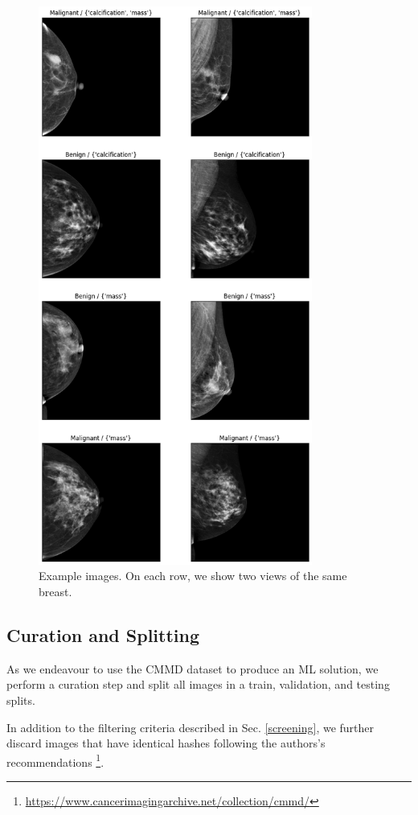 \documentclass[11pt]{article}
\begin{document}
\begin{figure}[htbp]
\centering
\includegraphics[width=9cm]{./images/previews.png}
\caption{\label{fig:preview}Example images. On each row, we show two views of the same breast.}
\end{figure}

\subsection{\label{split}Curation and Splitting}
\label{sec:org06b08c7}

As we endeavour to use the CMMD dataset to produce an ML solution, we
perform a curation step and split all images in a train, validation, and testing splits.

In addition to the filtering criteria described in Sec. \ref{screening}, we further
discard images that have identical hashes following the authors's recommendations \footnote{\url{https://www.cancerimagingarchive.net/collection/cmmd/}}.
\end{document}
